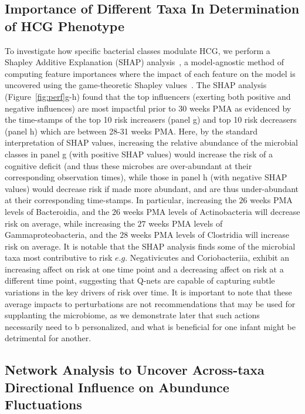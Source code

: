 \documentclass[onecolumn,10pt]{IEEEtran}
\def\qnet{Q-net\xspace}
\def\bact{Bacteroidia\xspace}
\def\actn{Actinobacteria\xspace}
\def\gamm{Gammaproteobacteria\xspace}
\def\clsd{Clostridia\xspace}
\begin{document}
\subsection*{Importance of Different Taxa In Determination of HCG Phenotype}
To investigate how specific bacterial classes modulate HCG, we  perform a Shapley Additive Explanation (SHAP) analysis~\cite{NIPS2017_7062,lundberg2018explainable}, a model-agnostic method of computing feature importances where the impact of each feature on the model is uncovered  using the game-theoretic Shapley values~\cite{vstrumbelj2014explaining,roth1988shapley}. The SHAP analysis (Figure~\ref{fig:perf}g-h) found that the top influencers (exerting both positive and negative influences)  are most impactful prior to $30$ weeks PMA as evidenced by the time-stamps of the top 10 risk increasers (panel g) and top 10 risk decreasers (panel h) which are between 28-31 weeks PMA. Here, by the standard interpretation of SHAP values, increasing the relative abundance of the microbial classes in panel g (with positive SHAP values) would increase the risk of a cognitive deficit (and thus these microbes are over-abundant at their corresponding observation times), while those in panel h (with negative SHAP values) would decrease risk if made more abundant, and are thus under-abundant at their corresponding time-stamps.
In particular, increasing  the $26$ weeks PMA levels of  \bact, and the $26$ weeks PMA levels of \actn will  decrease risk on average,  while increasing the $27$ weeks PMA levels of \gamm, and the $28$ weeks PMA levels of \clsd  will  increase risk on average. It is notable that the SHAP analysis finds some of the microbial taxa most contributive to risk $e.g.$ Negativicutes and Coriobacteriia,  exhibit an increasing affect on risk at one time point and a decreasing affect on risk at a different time point, suggesting that {\qnet}s are capable of capturing subtle variations in the key drivers of risk over time.  It is important to note that these average impacts to perturbations   are not recommendations that may be used for supplanting the microbiome, as we demonstrate later that such actions necessarily need to b personalized, and what is beneficial for one infant might be detrimental for another.

\subsection*{Network Analysis to Uncover Across-taxa Directional Influence on Abundunce Fluctuations}
\end{document}
